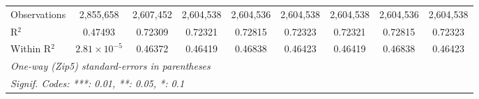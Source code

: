 \begin{table}[H]
{\begin{tabular}{lcccccccc}
 Observations & 2,855,658&2,607,452&2,604,538&2,604,536&2,604,538&2,604,538&2,604,536&2,604,538\\ 

 R$^2$ & 0.47493&0.72309&0.72321&0.72815&0.72323&0.72321&0.72815&0.72323\\ 

 Within R$^2$ & $2.81\times 10^{-5}$&0.46372&0.46419&0.46838&0.46423&0.46419&0.46838&0.46423\\ 

 \midrule\midrule\multicolumn{9}{l}{\emph{One-way (Zip5) standard-errors in parentheses}}\\ 

 \multicolumn{9}{l}{\emph{Signif. Codes: ***: 0.01, **: 0.05, *: 0.1}}\\ 

 \end{tabular}} 

 \end{table} 

  

